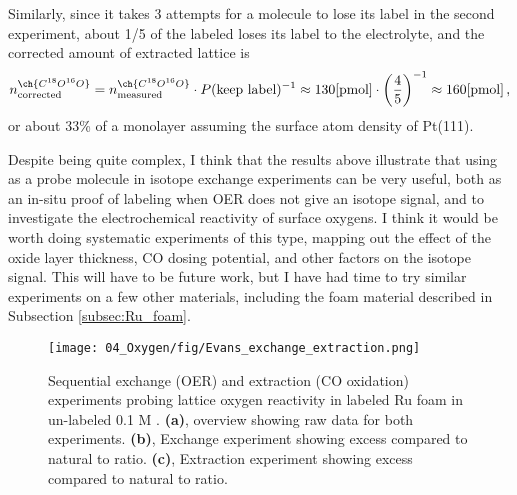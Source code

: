 Similarly, since it takes 3 attempts for a  molecule to lose its label in the second experiment, about 1/5 of the labeled  loses its label to the electrolyte, and the corrected amount of extracted lattice  is
\begin{equation}
n^{\ch{C^{18}O^{16}O}}_\text{corrected} = n^{\ch{C^{18}O^{16}O}}_{\text{measured}} \cdot P(\text{keep label})^{-1} \approx 130 \text{[pmol]} \cdot \left(\frac{4}{5}\right)^{-1} \approx 160 \text{[pmol]}\,,
\end{equation}
or about 33\% of a monolayer assuming the surface atom density of Pt(111).

Despite being quite complex, I think that the results above illustrate that using  as a probe molecule in isotope exchange experiments can be very useful, both as an in-situ proof of labeling when OER does not give an isotope signal, and to investigate the electrochemical reactivity of surface oxygens. I think it would be worth doing systematic experiments of this type, mapping out the effect of the oxide layer thickness, CO dosing potential, and other factors on the isotope signal. This will have to be future work, but I have had time to try similar experiments on a few other materials, including the  foam material described in Subsection \ref{subsec:Ru_foam}.

\begin{figure}[h!]
	\centering
	\texttt{[image: 04\_Oxygen/fig/Evans\_exchange\_extraction.png]}
	\caption{Sequential exchange (OER) and extraction (CO oxidation) experiments probing lattice oxygen reactivity in labeled Ru foam in un-labeled 0.1 M .  \textbf{(a)}, overview showing raw data for both experiments. \textbf{(b)}, Exchange experiment showing excess  compared to natural  to  ratio. \textbf{(c)}, Extraction experiment showing excess  compared to natural  to  ratio.
	}
	\label{fig:Evans_extraction}
\end{figure}

